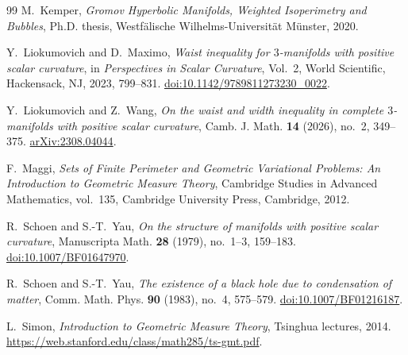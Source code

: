 \begin{thebibliography}{99}
M.~Kemper,
\emph{Gromov Hyperbolic Manifolds, Weighted Isoperimetry and Bubbles},
Ph.D. thesis, Westf\"alische Wilhelms-Universit\"at M\"unster, 2020.

Y.~Liokumovich and D.~Maximo,
\emph{Waist inequality for $3$-manifolds with positive scalar curvature},
in \emph{Perspectives in Scalar Curvature}, Vol.~2,
World Scientific, Hackensack, NJ, 2023, 799--831.
\href{https://doi.org/10.1142/9789811273230_0022}{doi:10.1142/9789811273230\_0022}.

Y.~Liokumovich and Z.~Wang,
\emph{On the waist and width inequality in complete $3$-manifolds with
positive scalar curvature},
Camb. J. Math. \textbf{14} (2026), no.~2, 349--375.
\href{https://arxiv.org/abs/2308.04044}{arXiv:2308.04044}.

F.~Maggi,
\emph{Sets of Finite Perimeter and Geometric Variational Problems:
An Introduction to Geometric Measure Theory},
Cambridge Studies in Advanced Mathematics, vol.~135,
Cambridge University Press, Cambridge, 2012.

R.~Schoen and S.-T.~Yau,
\emph{On the structure of manifolds with positive scalar curvature},
Manuscripta Math. \textbf{28} (1979), no.~1--3, 159--183.
\href{https://doi.org/10.1007/BF01647970}{doi:10.1007/BF01647970}.

R.~Schoen and S.-T.~Yau,
\emph{The existence of a black hole due to condensation of matter},
Comm. Math. Phys. \textbf{90} (1983), no.~4, 575--579.
\href{https://doi.org/10.1007/BF01216187}{doi:10.1007/BF01216187}.

L.~Simon,
\emph{Introduction to Geometric Measure Theory},
Tsinghua lectures, 2014.
\url{https://web.stanford.edu/class/math285/ts-gmt.pdf}.

\end{thebibliography}
